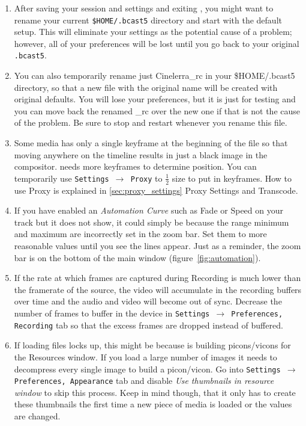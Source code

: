 \begin{enumerate}
	\item After saving your session and settings and exiting \CGG{}, you might want to rename your current \texttt{\$HOME/.bcast5} directory and start with the default setup. This will eliminate your settings as the potential cause of a problem; however, all of your preferences will be lost until you go back to your original \texttt{.bcast5}.
        \item You can also temporarily rename just Cinelerra\_rc in your \$HOME/.bcast5 directory, so
that a new file with the original name will be created with original defaults.  You will lose your preferences,
but it is just for testing and you can move back the renamed \CGG{}\_rc over the new one if that is not the
cause of the problem.  Be sure to stop and restart \CGG{} whenever you rename this file.
	\item Some media has only a single keyframe at the beginning of the file so that moving anywhere on the timeline results in just a black image in the compositor. \CGG{} needs more keyframes to determine position. You can temporarily use \texttt{Settings $\rightarrow$ Proxy} to $\frac{1}{2}$ size to put in keyframes. How to use Proxy is explained in \ref{sec:proxy_settings} {Proxy Settings and Transcode}.
        \item If you have enabled an \textit{Automation Curve} such as Fade or Speed on your track but it
does not show, it could simply be because the range minimum and maximum are incorrectly set in the zoom bar.
Set them to more reasonable values until you see the lines appear. Just as a reminder, the zoom bar is on the
bottom of the main window (figure~\ref{fig:automation}). 
 	\item If the rate at which frames are captured during Recording is much lower than the framerate of the source, the video will accumulate in the recording buffers over time and the audio and video will become out of sync. Decrease the number of frames to buffer in the device in \texttt{Settings $\rightarrow $ Preferences, Recording} tab so that the excess frames are dropped instead of buffered.
	\item If loading files locks up, this might be because \CGG{} is building picons/vicons for the Resources window. If you load a large number of images it needs to decompress every single image to build a picon/vicon. Go into \texttt{Settings $\rightarrow$ Preferences, Appearance} tab and disable \textit{Use thumbnails in resource window} to skip this process. Keep in mind though, that it only has to create these thumbnails the first time a new piece of media is loaded or the values are changed.

\end{enumerate}
